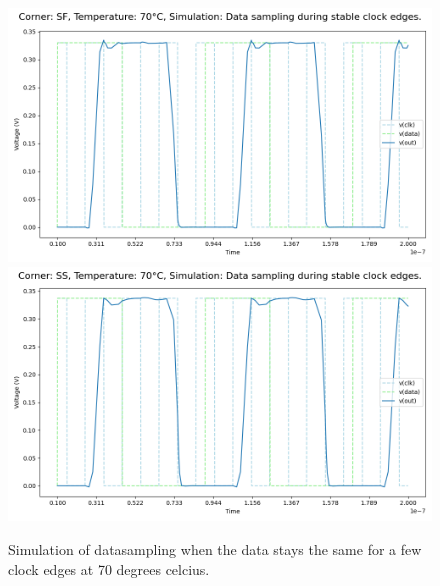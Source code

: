 \begin{figure}[H]
    \vspace{5pt}
    \includegraphics[height= 0.21\textheight]{figures/aimspice/SF/70/W2.csv.png}
    \vspace{5pt}
    \includegraphics[height= 0.21\textheight]{figures/aimspice/SS/70/W2.csv.png}
    \caption{Simulation of datasampling when the data stays the same for a few clock edges at 70 degrees celcius.}
    \label{fig:aimspice_W2_70}
\end{figure}

\pagebreak

\pagebreak

